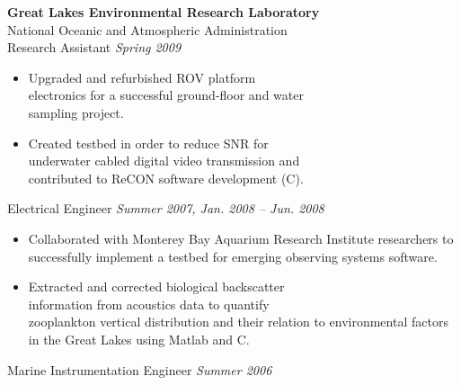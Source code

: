 \documentclass[11pt,twoside,a4paper]{article}
\begin{document}
{\begin{multicols}{2}
                \textbf{Great Lakes Environmental Research Laboratory}\\
                National Oceanic and Atmospheric Administration\\
                Research Assistant \hfill \textsl{Spring 2009} \\
                \vspace{ -10px}
                \begin{itemize}[noitemsep,nolistsep]
                	\item Upgraded and refurbished ROV platform \\electronics for a successful ground-floor and water \\sampling project.
                	\item Created testbed in order to reduce SNR for \\underwater cabled digital video transmission and \\contributed to ReCON software development (C).
                \end{itemize}
                \vspace{5px}
                Electrical Engineer  \hfill \textsl{Summer 2007, Jan. 2008 -- Jun. 2008}  \\
                \vspace{ -10px}	
                \begin{itemize}[noitemsep,nolistsep]
                	\item Collaborated with Monterey Bay Aquarium Research Institute researchers to successfully implement a testbed for emerging observing systems software.
                	\item Extracted and corrected biological backscatter \\information from acoustics data to quantify \\zooplankton vertical distribution and their relation to environmental factors in the Great Lakes using Matlab and C.
                \end{itemize}
                \vspace{5px}
                Marine Instrumentation Engineer \hfill \textsl{Summer 2006} \\
                \vspace{ -10px}	

\end{multicols}}
\end{document}
